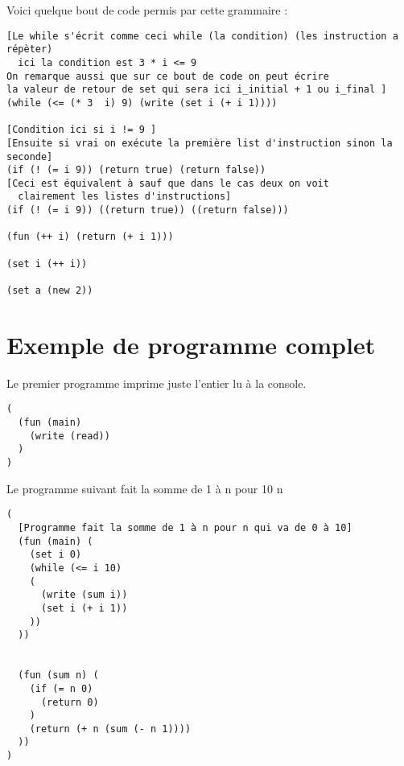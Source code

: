 Voici quelque bout de code permis par cette grammaire :

\begin{verbatim}
[Le while s'écrit comme ceci while (la condition) (les instruction a répèter)
  ici la condition est 3 * i <= 9
On remarque aussi que sur ce bout de code on peut écrire 
la valeur de retour de set qui sera ici i_initial + 1 ou i_final ]
(while (<= (* 3  i) 9) (write (set i (+ i 1)))) 
  
[Condition ici si i != 9 ]
[Ensuite si vrai on exécute la première list d'instruction sinon la seconde]
(if (! (= i 9)) (return true) (return false))
[Ceci est équivalent à sauf que dans le cas deux on voit 
  clairement les listes d'instructions]
(if (! (= i 9)) ((return true)) ((return false)))

(fun (++ i) (return (+ i 1)))

(set i (++ i))

(set a (new 2))
\end{verbatim}

\section{Exemple de programme complet}
Le premier programme imprime juste l'entier lu à la console.

\begin{verbatim}
(
  (fun (main) 
    (write (read))
  )
)
\end{verbatim}

Le programme suivant fait la somme de 1 à n pour 10 n
\begin{verbatim}
(
  [Programme fait la somme de 1 à n pour n qui va de 0 à 10]
  (fun (main) (
    (set i 0)
    (while (<= i 10)
    (
      (write (sum i))
      (set i (+ i 1))
    ))
  ))


  (fun (sum n) (
    (if (= n 0)
      (return 0)
    )
    (return (+ n (sum (- n 1))))
  ))
)

\end{verbatim}



